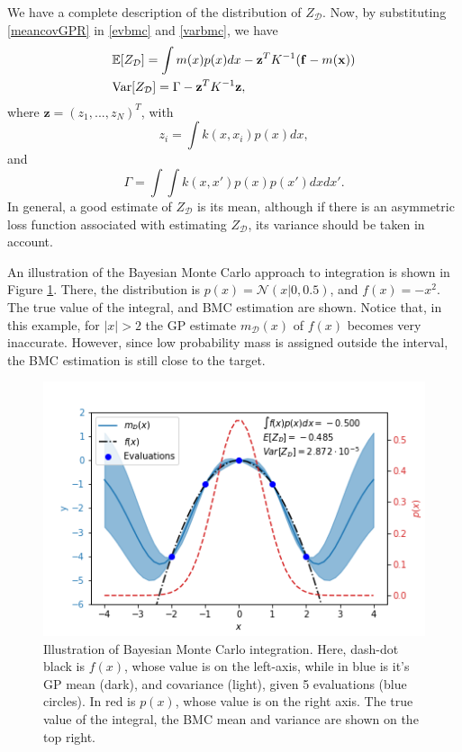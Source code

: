 We have a complete description of the distribution of $Z_\mathcal{D}$. Now, by substituting \eqref{meancovGPR} in \eqref{evbmc} and \eqref{varbmc}, we have 
\begin{equation}\label{evvarbmc2}
\begin{split}
& {\mathbb E}[Z_{\mathcal{D}}] = \int m(x) p(x) dx - \mathbf{z}^T K^{-1} (\mathbf{f}-m(\mathbf{x})) \\
& \mathrm{Var}[Z_{\mathcal{D}}] = \Gamma - \mathbf{z}^T K^{-1} \mathbf{z},
\end{split}
\end{equation}
where $\mathbf{z} = (z_1,...,z_N)^T$, with
\begin{equation}\label{zbmcdef}
z_i = \int k(x,x_i) p(x) dx,
\end{equation}
and 
\begin{equation}\label{varcoef}
\Gamma = \int \int k(x,x') p(x) p(x') dx dx'.
\end{equation}
In general, a good estimate of $Z_\mathcal{D}$ is its mean, although if there is an asymmetric loss function associated with estimating $Z_\mathcal{D}$, its variance should be taken in account.

An illustration of the Bayesian Monte Carlo approach to integration is shown in Figure \ref{bmcfig}. There, the distribution is $p(x) = \mathcal{N}(x|0,0.5)$, and $f(x) = -x^2$. The true value of the integral, and BMC estimation are shown. Notice that, in this example, for $|x|>2$ the GP estimate $m_\mathcal{D}(x)$ of $f(x)$ becomes very inaccurate. However, since low probability mass is assigned outside the interval, the BMC estimation is still close to the target.

\begin{figure}
	\centering
	\includegraphics[width=0.7\linewidth]{figs/exbmc.png}
	\caption[Illustration of Bayesian Monte Carlo integration]{\label{bmcfig} Illustration of Bayesian Monte Carlo integration. Here, dash-dot black is $f(x)$, whose value is on the left-axis, while in blue is it's GP mean (dark), and covariance (light), given 5 evaluations (blue circles). In red is $p(x)$, whose value is on the right axis. The true value of the integral, the BMC mean and variance are shown on the top right.}
\end{figure}

